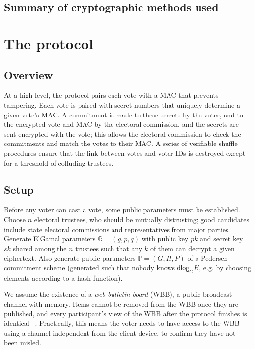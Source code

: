 \documentclass[12pt,a4paper]{article}
\theoremstyle{definition}
\begin{document}
\subsection{Summary of cryptographic methods used}
\section{The protocol}\label{sec-protocol}
\subsection{Overview}
At a high level, the protocol pairs each vote with a MAC that prevents tampering. Each vote is paired with secret numbers that uniquely determine a given vote's MAC. A commitment is made to these secrets by the voter, and to the encrypted vote and MAC by the electoral commission, and the secrets are sent encrypted with the vote; this allows the electoral commission to check the commitments and match the votes to their MAC. A series of verifiable shuffle procedures ensure that the link between votes and voter IDs is destroyed except for a threshold of colluding trustees.

\subsection{Setup}
Before any voter can cast a vote, some public parameters must be established. Choose $n$ electoral trustees, who should be mutually distrusting; good candidates include state electoral commissions and representatives from major parties. Generate ElGamal parameters $\mathbb{G}=(g, p, q)$ with public key $pk$ and secret key $sk$ shared among the $n$ trustees such that any $k$ of them can decrypt a given ciphertext. Also generate public parameters $\mathbb{P}=(G, H, P)$ of a Pedersen commitment scheme (generated such that nobody knows $\mathsf{dlog}_G{H}$, e.g. by choosing elements according to a hash function).

We assume the existence of a \textit{web bulletin board} (WBB), a public broadcast channel with memory. Items cannot be removed from the WBB once they are published, and every participant's view of the WBB after the protocol finishes is identical~\cite{culnane2014peered,hirschi2020fixing} . Practically, this means the voter needs to have access to the WBB using a channel independent from the client device, to confirm they have not been misled.
\end{document}
